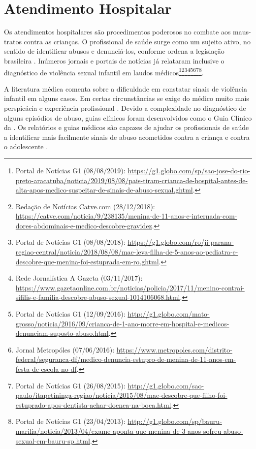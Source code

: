 
\section{Atendimento Hospitalar}\label{sec:hospital}

Os atendimentos hospitalares são procedimentos poderosos no combate aos maus-tratos contra as crianças. O profissional de saúde surge como um sujeito ativo, no sentido de identificar abusos e denunciá-los, conforme ordena a legislação brasileira \cite{Lei:8069:1990, almeida2012responsabilidade, costa2019maus}. Inúmeros jornais e portais de notícias já relataram inclusive o diagnóstico de violência sexual infantil em laudos médicos\footnote{Portal de Notícias G1 (08/08/2019): \url{https://g1.globo.com/sp/sao-jose-do-rio-preto-aracatuba/noticia/2019/08/08/pais-tiram-crianca-de-hospital-antes-de-alta-apos-medico-suspeitar-de-sinais-de-abuso-sexual.ghtml}.}\footnote{Redação de Notícias Catve.com (28/12/2018): \url{https://catve.com/noticia/9/238135/menina-de-11-anos-e-internada-com-dores-abdominais-e-medico-descobre-gravidez}.}\footnote{Portal de Notícias G1 (08/08/2018): \url{https://g1.globo.com/ro/ji-parana-regiao-central/noticia/2018/08/08/mae-leva-filha-de-5-anos-ao-pediatra-e-descobre-que-menina-foi-estuprada-em-ro.ghtml}.}\footnote{Rede Jornalística A Gazeta (03/11/2017): \url{https://www.gazetaonline.com.br/noticias/policia/2017/11/menino-contrai-sifilis-e-familia-descobre-abuso-sexual-1014106068.html}.}\footnote{Portal de Notícias G1 (12/09/2016): \url{http://g1.globo.com/mato-grosso/noticia/2016/09/crianca-de-1-ano-morre-em-hospital-e-medicos-denunciam-suposto-abuso.html}.}\footnote{Jornal Metropóles (07/06/2016): \url{https://www.metropoles.com/distrito-federal/seguranca-df/medico-denuncia-estupro-de-menina-de-11-anos-em-festa-de-escola-no-df}.}\footnote{Portal de Notícias G1 (26/08/2015): \url{http://g1.globo.com/sao-paulo/itapetininga-regiao/noticia/2015/08/mae-descobre-que-filho-foi-estuprado-apos-dentista-achar-doenca-na-boca.html}.}\footnote{Portal de Notícias G1 (23/04/2013): \url{http://g1.globo.com/sp/bauru-marilia/noticia/2013/04/exame-aponta-que-menina-de-3-anos-sofreu-abuso-sexual-em-bauru-sp.html}.}.

A literatura médica comenta sobre a dificuldade em constatar sinais de violência infantil em alguns casos. Em certas circunstâncias se exige do médico muito mais perspicácia e experiência profissional \cite{paiva2012violencia}. Devido a complexidade no diagnóstico de alguns episódios de abuso, guias clínicos foram desenvolvidos como o Guia Clínico da  \cite{OMS2017responding}. Os relatórios e guias médicos são capazes de ajudar os profissionais de saúde a identificar mais facilmente sinais de abuso acometidos contra a criança e contra o adolescente \cite{christian2015aap}.

